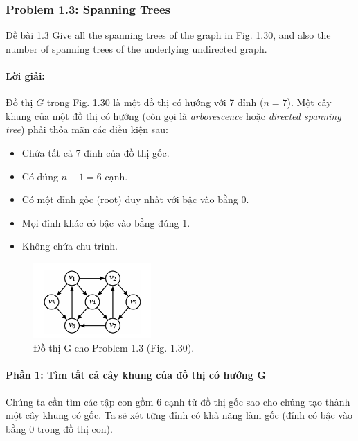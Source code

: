 \documentclass[a4paper,12pt]{article}
\begin{document}
\subsubsection{Problem 1.3: Spanning Trees}
\begin{problembox}{Đề bài 1.3}
    Give all the spanning trees of the graph in Fig. 1.30, and also the number of spanning trees of the underlying undirected graph.
\end{problembox}

\paragraph{Lời giải:}
Đồ thị $G$ trong Fig. 1.30 là một đồ thị có hướng với 7 đỉnh ($n=7$). Một cây khung của một đồ thị có hướng (còn gọi là \textit{arborescence} hoặc \textit{directed spanning tree}) phải thỏa mãn các điều kiện sau:
\begin{itemize}
    \item Chứa tất cả 7 đỉnh của đồ thị gốc.
    \item Có đúng $n-1 = 6$ cạnh.
    \item Có một đỉnh gốc (root) duy nhất với bậc vào bằng 0.
    \item Mọi đỉnh khác có bậc vào bằng đúng 1.
    \item Không chứa chu trình.
\end{itemize}

\begin{figure}[h!]
    \centering
    \includegraphics[width=0.4\textwidth]{fig1_30.png} 
    \caption{Đồ thị G cho Problem 1.3 (Fig. 1.30).}
    \label{fig:1_30}
\end{figure}

\paragraph{Phần 1: Tìm tất cả cây khung của đồ thị có hướng G}
Chúng ta cần tìm các tập con gồm 6 cạnh từ đồ thị gốc sao cho chúng tạo thành một cây khung có gốc. Ta sẽ xét từng đỉnh có khả năng làm gốc (đỉnh có bậc vào bằng 0 trong đồ thị con).
\end{document}
